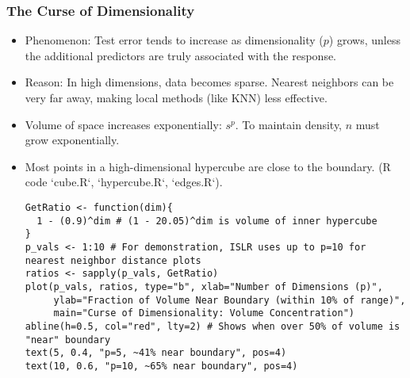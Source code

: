 \documentclass[12pt,a4paper]{article}
\begin{document}
    \subsubsection{The Curse of Dimensionality }
        \begin{itemize}
            \item Phenomenon: Test error tends to increase as dimensionality ($p$) grows, unless the additional predictors are truly associated with the response.
            \item Reason: In high dimensions, data becomes sparse. Nearest neighbors can be very far away, making local methods (like KNN) less effective.
            \item Volume of space increases exponentially: $s^p$. To maintain density, $n$ must grow exponentially.
            \item Most points in a high-dimensional hypercube are close to the boundary. (R code `cube.R`, `hypercube.R`, `edges.R`).
\begin{lstlisting}[caption={R code: Fraction of points near boundary (edges.R concept)}]
GetRatio <- function(dim){
  1 - (0.9)^dim # (1 - 20.05)^dim is volume of inner hypercube
}
p_vals <- 1:10 # For demonstration, ISLR uses up to p=10 for nearest neighbor distance plots
ratios <- sapply(p_vals, GetRatio)
plot(p_vals, ratios, type="b", xlab="Number of Dimensions (p)",
     ylab="Fraction of Volume Near Boundary (within 10% of range)",
     main="Curse of Dimensionality: Volume Concentration")
abline(h=0.5, col="red", lty=2) # Shows when over 50% of volume is "near" boundary
text(5, 0.4, "p=5, ~41% near boundary", pos=4)
text(10, 0.6, "p=10, ~65% near boundary", pos=4)
\end{lstlisting}
        \end{itemize}
\end{document}
